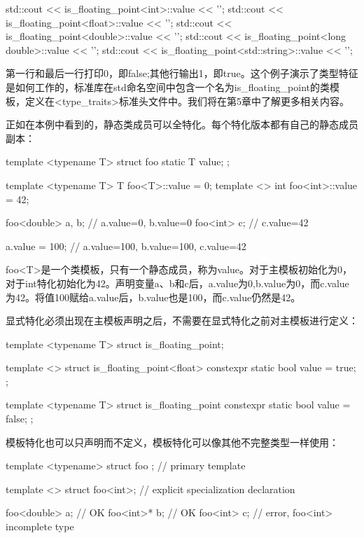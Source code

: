 \begin{cpp}
std::cout << is_floating_point<int>::value << '\n';
std::cout << is_floating_point<float>::value << '\n';
std::cout << is_floating_point<double>::value << '\n';
std::cout << is_floating_point<long double>::value << '\n';
std::cout << is_floating_point<std::string>::value << '\n';
\end{cpp}

第一行和最后一行打印0，即false;其他行输出1，即true。这个例子演示了类型特征是如何工作的，标准库在std命名空间中包含一个名为is\_floating\_point的类模板，定义在<type\_traits>标准头文件中。我们将在第5章中了解更多相关内容。

正如在本例中看到的，静态类成员可以全特化。每个特化版本都有自己的静态成员副本：

\begin{cpp}
template <typename T>
struct foo
{
	static T value;
};

template <typename T> T foo<T>::value = 0;
template <> int foo<int>::value = 42;

foo<double> a, b; // a.value=0, b.value=0
foo<int> c; // c.value=42

a.value = 100; // a.value=100, b.value=100, c.value=42
\end{cpp}

foo<T>是一个类模板，只有一个静态成员，称为value。对于主模板初始化为0，对于int特化初始化为42。声明变量a、b和c后，a.value为0,b.value为0，而c.value为42。将值100赋给a.value后，b.value也是100，而c.value仍然是42。

显式特化必须出现在主模板声明之后，不需要在显式特化之前对主模板进行定义：

\begin{cpp}
template <typename T>
struct is_floating_point;

template <>
struct is_floating_point<float>
{
	constexpr static bool value = true;
};

template <typename T>
struct is_floating_point
{
	constexpr static bool value = false;
};
\end{cpp}

模板特化也可以只声明而不定义，模板特化可以像其他不完整类型一样使用：

\begin{cpp}
template <typename>
struct foo {}; // primary template

template <>
struct foo<int>; // explicit specialization declaration

foo<double> a; // OK
foo<int>* b; // OK
foo<int> c; // error, foo<int> incomplete type
\end{cpp}

